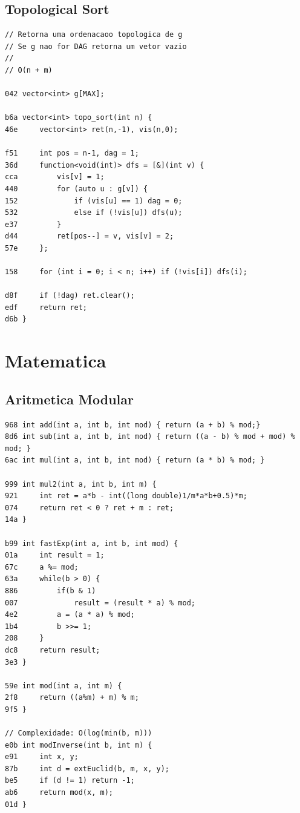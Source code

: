 \documentclass[11pt, a4paper, twoside]{article}
\begin{document}
\subsection{Topological Sort}
\begin{lstlisting}
// Retorna uma ordenacaoo topologica de g
// Se g nao for DAG retorna um vetor vazio
//
// O(n + m)

042 vector<int> g[MAX];

b6a vector<int> topo_sort(int n) {
46e 	vector<int> ret(n,-1), vis(n,0);
    	
f51 	int pos = n-1, dag = 1;
36d 	function<void(int)> dfs = [&](int v) {
cca 		vis[v] = 1;
440 		for (auto u : g[v]) {
152 			if (vis[u] == 1) dag = 0;
532 			else if (!vis[u]) dfs(u);
e37 		}
d44 		ret[pos--] = v, vis[v] = 2;
57e 	};
    
158 	for (int i = 0; i < n; i++) if (!vis[i]) dfs(i);
    
d8f 	if (!dag) ret.clear();	
edf 	return ret;
d6b }
\end{lstlisting}



%
%

\section{Matematica}

\subsection{Aritmetica Modular}
\begin{lstlisting}
968 int add(int a, int b, int mod) { return (a + b) % mod;}
8d6 int sub(int a, int b, int mod) { return ((a - b) % mod + mod) % mod; }
6ac int mul(int a, int b, int mod) { return (a * b) % mod; }

999 int mul2(int a, int b, int m) {
921     int ret = a*b - int((long double)1/m*a*b+0.5)*m;
074     return ret < 0 ? ret + m : ret;
14a }

b99 int fastExp(int a, int b, int mod) {
01a     int result = 1;
67c     a %= mod;
63a     while(b > 0) {
886         if(b & 1)
007             result = (result * a) % mod;
4e2         a = (a * a) % mod;
1b4         b >>= 1;
208     }
dc8     return result;
3e3 }

59e int mod(int a, int m) {
2f8     return ((a%m) + m) % m;
9f5 }

// Complexidade: O(log(min(b, m)))
e0b int modInverse(int b, int m) {
e91     int x, y;
87b     int d = extEuclid(b, m, x, y);
be5     if (d != 1) return -1;
ab6     return mod(x, m);
01d }
\end{lstlisting}
\end{document}
